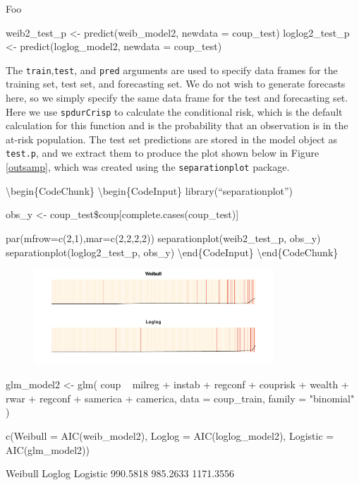 \documentclass[article]{jss}
\begin{document}
Foo

\begin{CodeChunk}
\begin{CodeInput}
weib2_test_p   <- predict(weib_model2, newdata = coup_test)
loglog2_test_p <- predict(loglog_model2, newdata = coup_test)
\end{CodeInput}
\end{CodeChunk}

\normalsize
The \texttt{train},\texttt{test}, and \texttt{pred} arguments are used
to specify data frames for the training set, test set, and forecasting
set. We do not wish to generate forecasts here, so we simply specify the
same data frame for the test and forecasting set. Here we use
\texttt{spdurCrisp} to calculate the conditional risk, which is the
default calculation for this function and is the probability that an
observation is in the at-risk population. The test set predictions are
stored in the model object as \texttt{test.p}, and we extract them to
produce the plot shown below in Figure \ref{outsamp}, which was created
using the \texttt{separationplot} package.

\textbackslash{}begin\{CodeChunk\} \textbackslash{}begin\{CodeInput\}
library(``separationplot'')

obs\_y \textless{}- coup\_test\$coup{[}complete.cases(coup\_test){]}

par(mfrow=c(2,1),mar=c(2,2,2,2)) separationplot(weib2\_test\_p, obs\_y)
separationplot(loglog2\_test\_p, obs\_y)
\textbackslash{}end\{CodeInput\} \textbackslash{}end\{CodeChunk\}

\begin{figure}
\begin{center}
\includegraphics[width=0.8\textwidth]{graphics/oos-sepplots.pdf}
\end{center}
\end{figure}

\begin{CodeChunk}
\begin{CodeInput}
glm_model2    <- glm(
  coup ~ milreg + instab + regconf + couprisk + wealth + rwar + regconf + 
    samerica + camerica,
  data = coup_train, family = "binomial"
)

c(Weibull = AIC(weib_model2), 
  Loglog = AIC(loglog_model2), 
  Logistic = AIC(glm_model2))
\end{CodeInput}
\begin{CodeOutput}
  Weibull    Loglog  Logistic 
 990.5818  985.2633 1171.3556 
\end{CodeOutput}
\end{CodeChunk}
\end{document}
